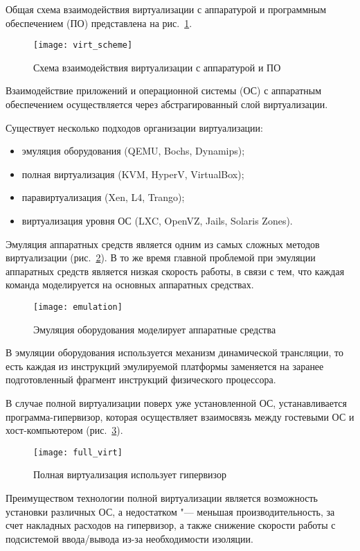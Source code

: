 Общая схема взаимодействия виртуализации с аппаратурой и программным обеспечением (ПО) представлена на рис.~\ref{pic:virt_scheme}.
\begin{figure}[ht]
    \centering
	\texttt{[image: virt\_scheme]}
	\caption{Схема взаимодействия виртуализации с аппаратурой и ПО}\label{pic:virt_scheme}
\end{figure}

Взаимодействие приложений и операционной системы (ОС) с аппаратным обеспечением осуществляется через абстрагированный слой виртуализации.

Существует несколько подходов организации виртуализации:
\begin{itemize}
    \item эмуляция оборудования (QEMU, Bochs, Dynamips);
    \item полная виртуализация (KVM, HyperV, VirtualBox);
    \item паравиртуализация (Xen, L4, Trango);
    \item виртуализация уровня ОС (LXC, OpenVZ, Jails, Solaris Zones).
\end{itemize}

Эмуляция аппаратных средств является одним из самых сложных методов виртуализации (рис.~\ref{pic:emulation}).
В то же время главной проблемой при эмуляции аппаратных средств является низкая скорость работы, в связи с тем, что каждая команда моделируется на основных аппаратных средствах.
\begin{figure}[ht]
    \centering
	\texttt{[image: emulation]}
	\caption{Эмуляция оборудования моделирует аппаратные средства}\label{pic:emulation}
\end{figure}

В эмуляции оборудования используется механизм динамической трансляции, то есть каждая из инструкций эмулируемой платформы заменяется на заранее подготовленный фрагмент инструкций физического процессора.

В случае полной виртуализации поверх уже установленной ОС, устанавливается программа-гипервизор, которая осуществляет взаимосвязь между гостевыми ОС и хост-компьютером (рис.~\ref{pic:full_virt}).
\begin{figure}[ht]
    \centering
	\texttt{[image: full\_virt]}
	\caption{Полная виртуализация использует гипервизор}\label{pic:full_virt}
\end{figure}

Преимуществом технологии полной виртуализации является возможность установки различных ОС, а недостатком "--- меньшая производительность, за счет накладных расходов на гипервизор, а также снижение скорости работы с подсистемой ввода/вывода из-за необходимости изоляции.

